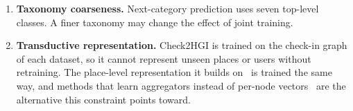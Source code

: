 \begin{enumerate}
    \item \textbf{Taxonomy coarseness.} Next-category prediction uses seven top-level
    classes. A finer taxonomy may change the effect of joint training.
    \item \textbf{Transductive representation.} Check2HGI is trained on the check-in
    graph of each dataset, so it cannot represent unseen places or users without
    retraining. The place-level representation it builds
    on~\cite{huang2023hgi} is trained the same way, and methods that learn aggregators
    instead of per-node vectors~\cite{hamilton2017graphsage} are the alternative this
    constraint points toward.

\end{enumerate}
